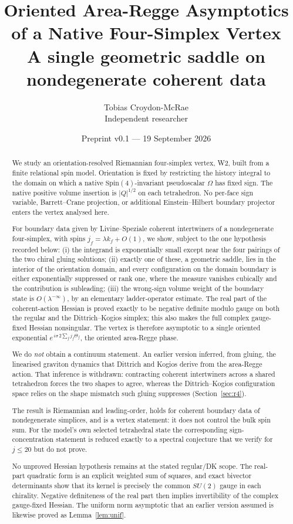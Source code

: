 \documentclass[11pt]{article}
\title{\textbf{Oriented Area-Regge Asymptotics\\of a Native Four-Simplex Vertex}\\[0.5em]
\large A single geometric saddle on nondegenerate coherent data}
\author{Tobias Croydon-McRae\\\small Independent researcher}
\date{Preprint v0.1 --- 19 September 2026}
\numberwithin{equation}{section}
\theoremstyle{definition}
\theoremstyle{remark}
\newcommand{\SUtwo}{SU(2)}
\newcommand{\SpinFour}{\mathrm{Spin}(4)}
\begin{document}
\maketitle

\begin{abstract}
We study an orientation-resolved Riemannian four-simplex vertex, W2, built from
a finite relational spin model. Orientation is fixed by restricting the history
integral to the domain on which a native $\SpinFour$-invariant pseudoscalar
$\Omega$ has fixed sign. The native positive volume insertion is
$|Q|^{1/2}$ on each tetrahedron. No per-face sign variable, Barrett--Crane
projection, or additional Einstein--Hilbert boundary projector enters the
vertex analysed here.

For boundary data given by Livine--Speziale coherent intertwiners of a
nondegenerate four-simplex, with spins $j_f=\lambda k_f+O(1)$, we show, subject
to the one hypothesis recorded below: (i) the
integrand is exponentially small except near the four pairings of the two chiral
gluing solutions; (ii) exactly one of these, a geometric saddle, lies in the
interior of the orientation domain, and every configuration on the domain
boundary is either exponentially suppressed or rank one, where the measure
vanishes cubically and the contribution is subleading; (iii) the wrong-sign
volume weight of the boundary state is $O(\lambda^{-\infty})$, by an elementary
ladder-operator estimate. The real part of the coherent-action Hessian is proved exactly to be negative
definite modulo gauge on both the regular and the Dittrich--Kogios simplex; this
also makes the full complex gauge-fixed Hessian nonsingular. The vertex is
therefore asymptotic to a single oriented exponential
$e^{\,i\sigma\,2\sum_f j_f\Theta_f}$, the oriented area-Regge phase.

We do \emph{not} obtain a continuum statement. An earlier version inferred, from
gluing, the linearised graviton dynamics that Dittrich and Kogios derive from the
area-Regge action. That inference is withdrawn: contracting coherent intertwiners
across a shared tetrahedron forces the two shapes to agree, whereas the
Dittrich--Kogios configuration space relies on the shape mismatch such gluing
suppresses (Section~\ref{sec:r4}).

The result is Riemannian and leading-order, holds for coherent boundary data of
nondegenerate simplices, and is a vertex statement: it does not control the bulk
spin sum. For the model's own selected tetrahedral state the corresponding
sign-concentration statement is reduced exactly to a spectral conjecture that we
verify for $j\le20$ but do not prove.

No unproved Hessian hypothesis remains at the stated regular/DK scope. The
real-part quadratic form is an explicit weighted sum of squares, and exact
bivector determinants show that its kernel is precisely the common $\SUtwo$
gauge in each chirality. Negative definiteness of the real part then implies
invertibility of the complex gauge-fixed Hessian. The uniform norm asymptotic
that an earlier version assumed is likewise proved as Lemma~\ref{lem:unif}.
\end{abstract}
\end{document}
